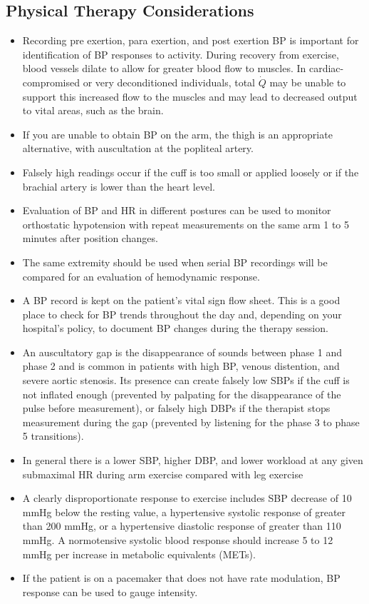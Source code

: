 \subsection{Physical Therapy Considerations}
\begin{itemize}
\item Recording pre exertion, para exertion, and post exertion BP is important for identification of BP responses to activity. During recovery from exercise, blood vessels dilate to allow for greater blood flow to muscles. In cardiac-compromised or very deconditioned individuals, total $\dot{Q}$ may be unable to support this increased flow to the muscles and may lead to decreased output to vital areas, such as the brain.
\item If you are unable to obtain BP on the arm, the thigh is an appropriate alternative, with auscultation at the popliteal artery.
\item Falsely high readings occur if the cuff is too small or applied loosely or if the brachial artery is lower than the heart level.
\item Evaluation of BP and HR in different postures can be used to monitor orthostatic hypotension with repeat measurements on the same arm 1 to 5 minutes after position changes.
\item The same extremity should be used when serial BP recordings will be compared for an evaluation of hemodynamic response.
\item A BP record is kept on the patient’s vital sign flow sheet. This is a good place to check for BP trends throughout the day and, depending on your hospital’s policy, to document BP changes during the therapy session.
\item An auscultatory gap is the disappearance of sounds between phase 1 and phase 2 and is common in patients with high BP, venous distention, and severe aortic stenosis. Its presence can create falsely low SBPs if the cuff is not inflated enough (prevented by palpating for the disappearance of the pulse before measurement), or falsely high DBPs if the therapist stops measurement during the gap (prevented by listening for the phase 3 to phase 5 transitions).
\item In general there is a lower SBP, higher DBP, and lower workload at any given submaximal HR during arm exercise compared with leg exercise \cite{dias_differences_2022}
\item A clearly disproportionate response to exercise includes SBP decrease of 10 mmHg below the resting value, a hypertensive systolic response of greater than 200 mmHg, or a hypertensive diastolic response of greater than 110 mmHg. A normotensive systolic blood response should increase 5 to 12 mmHg per increase in metabolic equivalents (METs).\footnotemark{}
\item If the patient is on a pacemaker that does not have rate modulation, BP response can be used to gauge intensity. 
\end{itemize}

